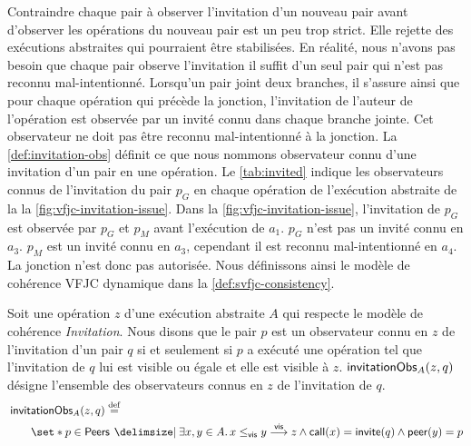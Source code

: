 Contraindre chaque pair à observer l'invitation d'un nouveau pair avant d'observer les opérations du nouveau pair est un peu trop strict.
Elle rejette des exécutions abstraites qui pourraient être stabilisées.
En réalité, nous n'avons pas besoin que chaque pair observe l'invitation il suffit d'un seul pair qui n'est pas reconnu mal-intentionné.
Lorsqu'un pair joint deux branches, il s'assure ainsi que pour chaque opération qui précède la jonction, l'invitation de l'auteur de l'opération est observée par un invité connu dans chaque branche jointe.
Cet observateur ne doit pas être reconnu mal-intentionné à la jonction.
La \autoref{def:invitation-obs} définit ce que nous nommons observateur connu d'une invitation d'un pair en une opération.
Le \autoref{tab:invited} indique les observateurs connus de l'invitation du pair $p_G$ en chaque opération de l'exécution abstraite de la la \autoref{fig:vfjc-invitation-issue}.
Dans la \autoref{fig:vfjc-invitation-issue}, l'invitation de $p_G$ est observée par $p_G$ et $p_M$ avant l'exécution de $a_1$.
$p_G$ n'est pas un invité connu en $a_3$.
$p_M$ est un invité connu en $a_3$, cependant il est reconnu mal-intentionné en $a_4$.
La jonction n'est donc pas autorisée.
Nous définissons ainsi le modèle de cohérence \ac{VFJC} dynamique dans la \autoref{def:svfjc-consistency}.

\begin{definition}\label{def:invitation-obs}
Soit une opération $z$ d'une exécution abstraite $A$ qui respecte le modèle de cohérence \emph{Invitation}.
Nous disons que le pair $p$ est un observateur connu en $z$ de l'invitation d'un pair $q$ si et seulement si $p$ a exécuté une opération tel que l'invitation de $q$ lui est visible ou égale et elle est visible à $z$.
$\operatorname{\mathsf{invitationObs}}_A(z, q)$ désigne l'ensemble des observateurs connus en $z$ de l'invitation de $q$.
\begin{equation*}\begin{split}
    \MoveEqLeft\trm{invitationObs}_A(z, q) \defeq\\
    &\set*{p \in \trm{Peers} \given \exists x, y \in A \qsep x \viseq y \vis z \land \trm{call}(x) = \trm{invite}(q) \land \trm{peer}(y) = p}
\end{split}\end{equation*}
\end{definition}

